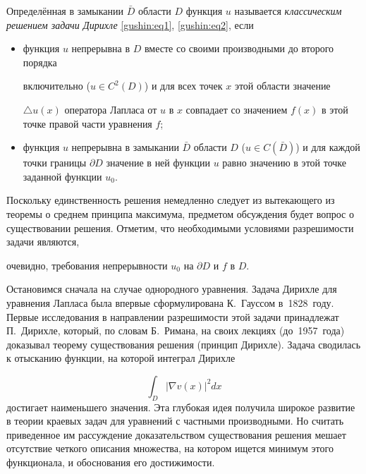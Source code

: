 \begin{definition}[1]Определённая в замыкании $\bar{D}$ области $D$ функция $u$ называется \textit{классическим решением задачи Дирихле} \eqref{gushin:eq1}, \eqref{gushin:eq2}, если

\begin{itemize}

\item[--] функция $u$ непрерывна в $D$ вместе со своими производными до второго порядка

включительно ($u \in C^2(D)$) и для всех точек $x$ этой области значение

$\bigtriangleup u(x) $ оператора Лапласа от $u$ в $x$ совпадает со значением $f(x)$ в этой точке правой части уравнения $f$;



\item[--] функция $u$ непрерывна в замыкании $\bar{D}$ области $D$ ($u \in

C({\bar{D}})$) и для каждой точки границы $\partial D$ значение в ней функции $u$ равно значению в этой точке заданной функции $u_0$.



\end{itemize}

\end{definition}



Поскольку единственность решения немедленно следует из вытекающего из теоремы о среднем принципа максимума,  предметом обсуждения будет вопрос о существовании решения. Отметим, что необходимыми условиями разрешимости задачи являются,

очевидно, требования непрерывности $u_0$ на $\partial D$ и $f$ в $D$.



Остановимся сначала на случае однородного уравнения. Задача Дирихле для уравнения Лапласа была впервые сформулирована К.~Гауссом в~1828~году.  Первые исследования в направлении разрешимости этой задачи принадлежат П.~Дирихле, который, по словам Б.~Римана, на своих лекциях (до~1957~года) доказывал теорему существования решения (принцип Дирихле). Задача сводилась к отысканию функции, на которой интеграл Дирихле 

$$\int_D |\nabla v(x)|^2 dx$$ достигает наименьшего значения. Эта глубокая идея получила широкое развитие в теории краевых задач для уравнений с частными производными. Но считать приведенное им рассуждение доказательством существования решения мешает отсутствие четкого описания множества, на котором ищется минимум этого функционала, и обоснования его достижимости.



